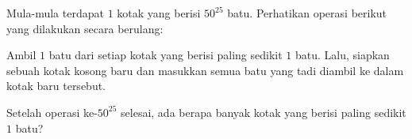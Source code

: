 Mula-mula terdapat $1$ kotak yang berisi $50^{25}$ batu. Perhatikan operasi berikut yang dilakukan secara berulang:

Ambil $1$ batu dari setiap kotak yang berisi paling sedikit $1$ batu. Lalu, siapkan sebuah kotak kosong baru dan masukkan semua batu yang tadi diambil ke dalam kotak baru tersebut.

Setelah operasi ke-$50^{25}$ selesai, ada berapa banyak kotak yang berisi paling sedikit $1$ batu?